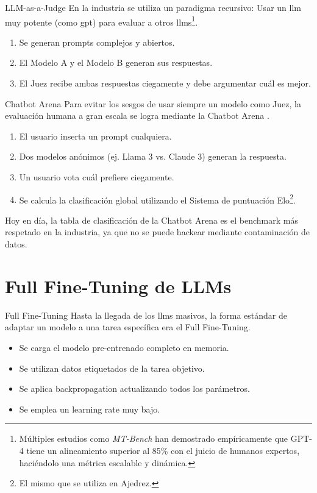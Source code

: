 \begin{frame}{LLM-as-a-Judge}
En la industria se utiliza un paradigma recursivo: \alert{Usar un \gls{llm} muy potente (como \gls{gpt}) para evaluar a otros \glspl{llm}}\footnote{Múltiples estudios como \textit{MT-Bench} \cite{bai2024mt} han demostrado empíricamente que GPT-4 tiene un alineamiento superior al 85\% con el juicio de humanos expertos, haciéndolo una métrica escalable y dinámica.}.

\begin{enumerate}
    \item Se generan prompts \alert{complejos y abiertos}.
    \item El Modelo A y el Modelo B generan sus \alert{respuestas}.
    \item El \alert{Juez} recibe ambas respuestas ciegamente y debe argumentar cuál es mejor.
\end{enumerate}
\end{frame}

\begin{frame}{Chatbot Arena}
Para evitar los sesgos de usar siempre un modelo como Juez, la evaluación humana a gran escala se logra mediante la \alert{Chatbot Arena} \cite{chiang2024chatbot}.

\begin{enumerate}
    \item El usuario inserta un prompt cualquiera.
    \item Dos modelos anónimos (ej. Llama 3 vs. Claude 3) generan la respuesta.
    \item Un usuario vota cuál prefiere ciegamente.
    \item Se calcula la clasificación global utilizando el \alert{Sistema de puntuación Elo}\footnote{El mismo que se utiliza en Ajedrez.}.
\end{enumerate}

Hoy en día, la tabla de clasificación de la Chatbot Arena es el benchmark \alert{más respetado} en la industria, ya que no se puede hackear mediante contaminación de datos.
\end{frame}

\section{Full Fine-Tuning de LLMs}

\begin{frame}{Full Fine-Tuning}
Hasta la llegada de los \glspl{llm} masivos, la forma estándar de adaptar un modelo a una tarea específica era el \alert{Full Fine-Tuning}.

\begin{itemize}
    \item Se carga el modelo pre-entrenado completo en memoria.
    \item Se utilizan datos etiquetados de la tarea objetivo.
    \item Se aplica \alert{backpropagation} actualizando \alert{todos los parámetros}.
    \item Se emplea un \alert{learning rate} muy bajo.
\end{itemize}
\end{frame}

